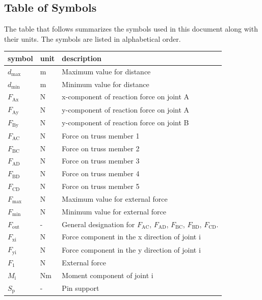 \documentclass[12pt]{article}
\begin{document}
\subsection{Table of Symbols}

The table that follows summarizes the symbols used in this document along with
their units. The symbols are listed in alphabetical order.

\renewcommand{\arraystretch}{1.2}
\noindent \begin{longtable*}{l l p{12cm}} \toprule
\textbf{symbol} & \textbf{unit} & \textbf{description}\\
\midrule 
$d_{\text{max}}$ & \si{\metre} & Maximum value for distance \\
$d_{\text{min}}$ & \si{\metre} & Minimum value for distance \\
$F_\text{Ax}$ & \si{\newton} & x-component of reaction force on joint A \\
$F_\text{Ay}$ & \si{\newton} & y-component of reaction force on joint A \\ 
$F_\text{By}$ & \si{\newton} & y-component of reaction force on joint B \\
$F_\text{AC}$ & \si{\newton} & Force on truss member 1 \\
$F_\text{BC}$ & \si{\newton} & Force on truss member 2 \\
$F_\text{AD}$ & \si{\newton} & Force on truss member 3 \\
$F_\text{BD}$ & \si{\newton} & Force on truss member 4 \\
$F_\text{CD}$ & \si{\newton} & Force on truss member 5 \\
$F_{\text{max}}$ & \si{\newton} & Maximum value for external force \\
$F_{\text{min}}$ & \si{\newton} & Minimum value for external force \\
$F_\text{out}$ & - & General designation for $F_\text{AC}$, $F_\text{AD}$, 
$F_\text{BC}$, $F_\text{BD}$, $F_\text{CD}$.\\
$F_\text{xi}$ & \si{\newton} & Force component in the x direction of joint i \\
$F_\text{yi}$ & \si{\newton} & Force component in the y direction of joint i \\
$F_\text{1}$ & \si{\newton} & External force \\
$M_\text{i}$ & \si{\newton}\si{\metre} & Moment component of joint i \\
$S_\text{p}$ & - & Pin support \\

\end{longtable*}
\end{document}

